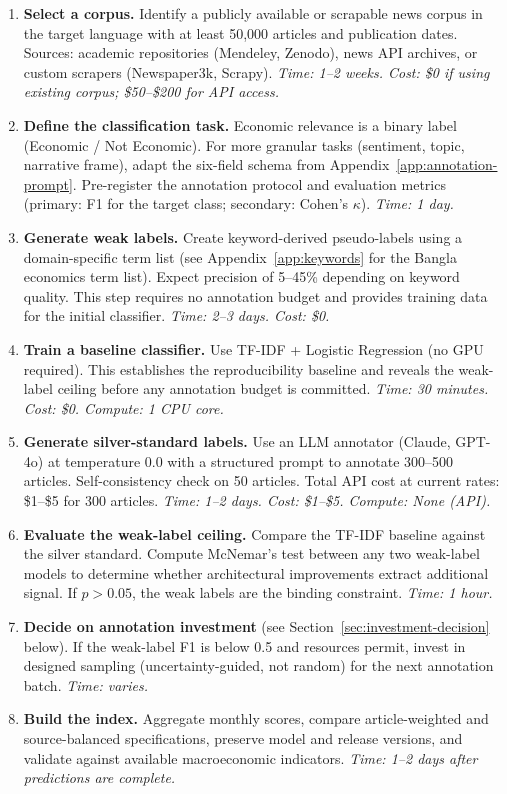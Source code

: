 \begin{enumerate}
    \item \textbf{Select a corpus.} Identify a publicly available or scrapable news corpus in the target language with at least 50,000 articles and publication dates. Sources: academic repositories (Mendeley, Zenodo), news API archives, or custom scrapers (Newspaper3k, Scrapy). \textit{Time: 1--2 weeks. Cost: \$0 if using existing corpus; \$50--\$200 for API access.}

    \item \textbf{Define the classification task.} Economic relevance is a binary label (Economic / Not Economic). For more granular tasks (sentiment, topic, narrative frame), adapt the six-field schema from Appendix~\ref{app:annotation-prompt}. Pre-register the annotation protocol and evaluation metrics (primary: F1 for the target class; secondary: Cohen's $\kappa$). \textit{Time: 1 day.}

    \item \textbf{Generate weak labels.} Create keyword-derived pseudo-labels using a domain-specific term list (see Appendix~\ref{app:keywords} for the Bangla economics term list). Expect precision of 5--45\% depending on keyword quality. This step requires no annotation budget and provides training data for the initial classifier. \textit{Time: 2--3 days. Cost: \$0.}

    \item \textbf{Train a baseline classifier.} Use TF-IDF + Logistic Regression (no GPU required). This establishes the reproducibility baseline and reveals the weak-label ceiling before any annotation budget is committed. \textit{Time: 30 minutes. Cost: \$0. Compute: 1 CPU core.}

    \item \textbf{Generate silver-standard labels.} Use an LLM annotator (Claude, GPT-4o) at temperature 0.0 with a structured prompt to annotate 300--500 articles. Self-consistency check on 50 articles. Total API cost at current rates: \$1--\$5 for 300 articles. \textit{Time: 1--2 days. Cost: \$1--\$5. Compute: None (API).}

    \item \textbf{Evaluate the weak-label ceiling.} Compare the TF-IDF baseline against the silver standard. Compute McNemar's test between any two weak-label models to determine whether architectural improvements extract additional signal. If $p > 0.05$, the weak labels are the binding constraint. \textit{Time: 1 hour.}

    \item \textbf{Decide on annotation investment} (see Section~\ref{sec:investment-decision} below). If the weak-label F1 is below 0.5 and resources permit, invest in designed sampling (uncertainty-guided, not random) for the next annotation batch. \textit{Time: varies.}

    \item \textbf{Build the index.} Aggregate monthly scores, compare article-weighted and source-balanced specifications, preserve model and release versions, and validate against available macroeconomic indicators. \textit{Time: 1--2 days after predictions are complete.}
\end{enumerate}

